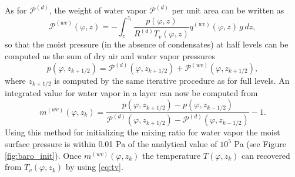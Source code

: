 \documentclass{agujournal}
\begin{document}
{As for $\mathcal{P}^{(d)}$, the weight of water vapor $\mathcal{P}^{(d)}$ per unit area can be written as
\begin{equation}
{\mathcal{P}}^{(wv)}(\varphi,z)=-\int_z^{z_t}\frac{p(\varphi,z)}{R^{(d)} T_v(\varphi,z)}q^{(wv)}(\varphi,z)\, g\, dz,\label{eq:Upvw}
\end{equation}
so that the moist pressure (in the absence of condensates) at half levels can be computed as the sum of dry air and water vapor pressures
\begin{equation}
p(\varphi,z_{k+1/2})={\mathcal{P}}^{(d)}(\varphi,z_{k+1/2})+{\mathcal{P}}^{(wv)}(\varphi,z_{k+1/2}),
\end{equation}
where $z_{k+1/2}$ is computed by the same iterative procedure as for full levels. An integrated value for water vapor in a layer can now be computed from
\begin{equation}
m^{(wv)}(\varphi,z_k)=\frac{p(\varphi,z_{k+1/2})-p(\varphi,z_{k-1/2})}{{\mathcal{P}}^{(d)}(\varphi,z_{k+1/2})-{\mathcal{P}}^{(d)}(\varphi,z_{k-1/2})}-1.
\end{equation}
Using this method for initializing the mixing ratio for water vapor the moist surface pressure is within 0.01 Pa of the analytical value of $10^5$ Pa (see Figure \ref{fig:baro_init}). Once $m^{(wv)}(\varphi,z_k)$ the temperature $T(\varphi,z_k)$ can recovered from $T_v(\varphi,z_k)$ by using \eqref{eq:tv}.

}
\end{document}
